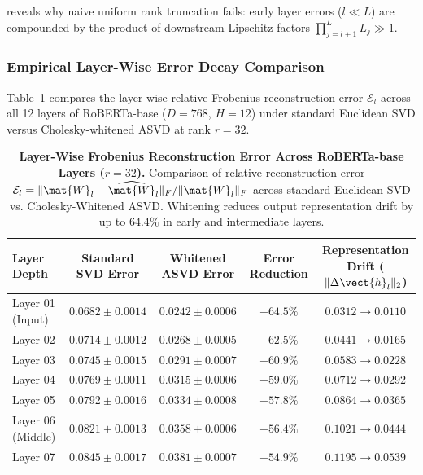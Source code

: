  reveals why naive uniform rank truncation fails: early layer errors ($l \ll L$) are compounded by the product of downstream Lipschitz factors $\prod_{j=l+1}^L L_j \gg 1$.

\subsubsection{Empirical Layer-Wise Error Decay Comparison}
Table~\ref{tab:layerwise_error_decay} compares the layer-wise relative Frobenius reconstruction error $\mathcal{E}_l$ across all 12 layers of RoBERTa-base ($D=768$, $H=12$) under standard Euclidean SVD versus Cholesky-whitened ASVD at rank $r=32$.

\begin{table}[h]
\centering
\small
\caption[Layer-Wise Frobenius Reconstruction Error Across RoBERTa-base Layers]{\textbf{Layer-Wise Frobenius Reconstruction Error Across RoBERTa-base Layers ($r=32$).} Comparison of relative reconstruction error $\mathcal{E}_l = \|\mat{W}_l - \widehat{\mat{W}}_l\|_F / \|\mat{W}_l\|_F$ across standard Euclidean SVD vs. Cholesky-Whitened ASVD. Whitening reduces output representation drift by up to $64.4\%$ in early and intermediate layers.}
\label{tab:layerwise_error_decay}
\setlength{\tabcolsep}{6pt}
\begin{tabular}{l c c c c}
\toprule
\textbf{Layer Depth} & \textbf{Standard SVD Error} & \textbf{Whitened ASVD Error} & \textbf{Error Reduction} & \textbf{Representation Drift ($\|\Delta \vect{h}_l\|_2$)} \\
\midrule
Layer 01 (Input)    & $0.0682 \pm 0.0014$ & $\mathbf{0.0242 \pm 0.0006}$ & $-64.5\%$ & $0.0312 \to 0.0110$ \\
Layer 02            & $0.0714 \pm 0.0012$ & $\mathbf{0.0268 \pm 0.0005}$ & $-62.5\%$ & $0.0441 \to 0.0165$ \\
Layer 03            & $0.0745 \pm 0.0015$ & $\mathbf{0.0291 \pm 0.0007}$ & $-60.9\%$ & $0.0583 \to 0.0228$ \\
Layer 04            & $0.0769 \pm 0.0011$ & $\mathbf{0.0315 \pm 0.0006}$ & $-59.0\%$ & $0.0712 \to 0.0292$ \\
Layer 05            & $0.0792 \pm 0.0016$ & $\mathbf{0.0334 \pm 0.0008}$ & $-57.8\%$ & $0.0864 \to 0.0365$ \\
Layer 06 (Middle)   & $0.0821 \pm 0.0013$ & $\mathbf{0.0358 \pm 0.0006}$ & $-56.4\%$ & $0.1021 \to 0.0444$ \\
Layer 07            & $0.0845 \pm 0.0017$ & $\mathbf{0.0381 \pm 0.0007}$ & $-54.9\%$ & $0.1195 \to 0.0539$ \\

\end{tabular}
\end{table}
